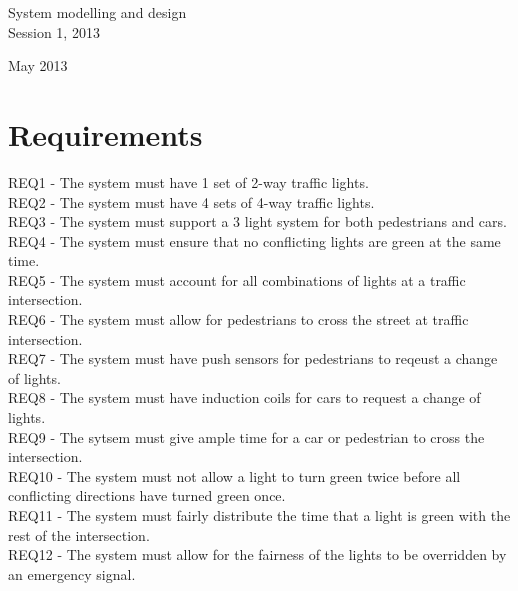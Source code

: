 \documentclass[a4paper]{article}
\author{Vincent Tran z3415372}
\begin{document}
\thispagestyle{empty}      %
\begin{flushright}{\Large
System modelling and design \\[.3em]
Session 1, 2013}

 May 2013
\end{flushright}

\vfill
{}%
\vfill
\newpage
\setcounter{page}{1}

\section{Requirements}
REQ1 - The system must have 1 set of 2-way traffic lights.\\
REQ2 - The system must have 4 sets of 4-way traffic lights.\\
REQ3 - The system must support a 3 light system for both pedestrians and cars.\\
REQ4 - The system must ensure that no conflicting lights are green at the same time.\\
REQ5 - The system must account for all combinations of lights at a traffic intersection.\\
REQ6 - The system must allow for pedestrians to cross the street at traffic intersection.\\
REQ7 - The system must have push sensors for pedestrians to reqeust a change of lights.\\
REQ8 - The system must have induction coils for cars to request a change of lights.\\
REQ9 - The sytsem must give ample time for a car or pedestrian to cross the intersection.\\
REQ10 - The system must not allow a light to turn green twice before all conflicting directions have turned green once.\\
REQ11 - The system must fairly distribute the time that a light is green with the rest of the intersection.\\
REQ12 - The system must allow for the fairness of the lights to be overridden by an emergency signal.\\
\end{document}
